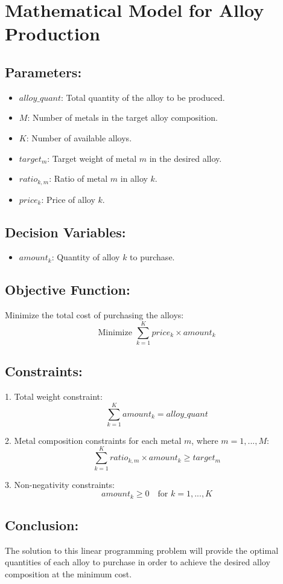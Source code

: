 \documentclass{article}
\begin{document}
\section*{Mathematical Model for Alloy Production}

\subsection*{Parameters:}
\begin{itemize}
    \item $alloy\_quant$: Total quantity of the alloy to be produced.
    \item $M$: Number of metals in the target alloy composition.
    \item $K$: Number of available alloys.
    \item $target_m$: Target weight of metal $m$ in the desired alloy.
    \item $ratio_{k,m}$: Ratio of metal $m$ in alloy $k$.
    \item $price_k$: Price of alloy $k$.
\end{itemize}

\subsection*{Decision Variables:}
\begin{itemize}
    \item $amount_k$: Quantity of alloy $k$ to purchase.
\end{itemize}

\subsection*{Objective Function:}

Minimize the total cost of purchasing the alloys:
\[
\text{Minimize } \sum_{k=1}^{K} price_k \times amount_k
\]

\subsection*{Constraints:}

1. Total weight constraint:
   \[
   \sum_{k=1}^{K} amount_k = alloy\_quant
   \]

2. Metal composition constraints for each metal $m$, where $m=1,...,M$:
   \[
   \sum_{k=1}^{K} ratio_{k,m} \times amount_k \geq target_m
   \]

3. Non-negativity constraints:
   \[
   amount_k \geq 0 \quad \text{for } k=1,...,K
   \]

\subsection*{Conclusion:}

The solution to this linear programming problem will provide the optimal quantities of each alloy to purchase in order to achieve the desired alloy composition at the minimum cost.
\end{document}
